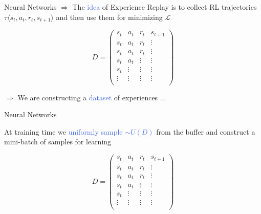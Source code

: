 \documentclass{beamer}
\begin{document}
\begin{frame}{Neural Networks}
	$\Rightarrow$ The \textcolor{RoyalBlue}{idea} of Experience Replay is to collect RL trajectories $\tau \langle s_t,a_t,r_t,s_{t+1}\rangle$ and then use them for minimizing $\mathcal{L}$ 

	\begin{equation*}
		D = 
		\begin{pmatrix}
			s_t & a_t & r_t & s_{t+1} \\
			s_t & a_t & r_t & \vdots \\
			s_t & a_t & r_t & \vdots \\
			s_t & a_t & \vdots & \vdots \\
			s_t & \vdots & \vdots & \vdots \\
			\vdots & \vdots & \vdots & \vdots \\
		\end{pmatrix}
	\end{equation*}

	\bigskip
	$\Rightarrow$ We are constructing a \textcolor{RoyalBlue}{dataset} of experiences ...

\end{frame}


\begin{frame}{Neural Networks}

	At training time we \textcolor{RoyalBlue}{uniformly sample $\sim U(D)$} from the buffer and construct a \textcolor{skymagenta}{mini-batch} of samples for learning

	\begin{equation*}
		D = 
		\begin{pmatrix}
			s_t & a_t & r_t & s_{t+1} \\
			s_t & a_t & r_t & \vdots \\
			s_t & a_t & r_t & \vdots \\
			s_t & a_t & \vdots & \vdots \\
			s_t & \vdots & \vdots & \vdots \\
			\vdots & \vdots & \vdots & \vdots \\
		\end{pmatrix}
	\end{equation*}

\end{frame}
\end{document}
